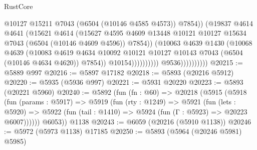 \begin{lexlean}{RustCore}
\begin{coremodule}
                                            @10127
                                            @15211
                                            @7043
                                            (@6504 (@10146 @4585 @4573))
                                            @7854))
                                        (@19837
                                          @4614
                                          @4641
                                          (@15621
                                            @4614
                                            (@15627
                                              @4595
                                              @4609
                                              @13448
                                              @10121
                                              @10127
                                              @15634
                                              @7043
                                              (@6504 (@10146 @4609 @4596))
                                              @7854))
                                          (@10063
                                            @4639
                                            @1430
                                            (@10068
                                              @4639
                                              (@10083
                                                @4619
                                                @4634
                                                @10092
                                                @10121
                                                @10127
                                                @10143
                                                @7043
                                                (@6504 (@10146 @4634 @4620))
                                                @7854))
                                            @10154))))))))))
                        @9536))))))))))
@20215 := @5889 @997
@20216 := @5897 @17182
@20218 := @5893 (@20216 @5912)
@20220 := @5935 (@5936 @997)
@20221 := @5931 @20220
@20223 := @5893 (@20221 @5960)
@20240 := @5892
    (fun (fn : @60) =>
    @20218
      (@5915
        (@5918
          (fun (params : @5917) =>
          @5919
            (fun (rty : @1249) =>
            @5921
              (fun (lets : @5920) =>
              @5922 (fun (tail : @1410) => @5924 (fun (Γ : @5923) => @20223 @6007))))))
        @6053))
    @1138
@20243 := @6059 (@20216 (@5910 @1138))
@20246 := @5972 (@5973 @1138) @17185
@20250 := @5893 (@5964 (@20246 @5981) @5985)

\end{coremodule}
\end{lexlean}
